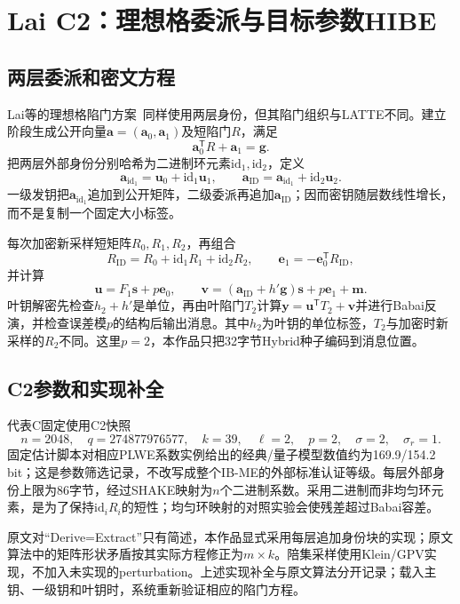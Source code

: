 \documentclass[UTF8,a4paper,12pt,oneside,openany,fontset=fandol]{ctexrep}
\begin{document}
\section{Lai C2：理想格委派与目标参数HIBE}
\subsection{两层委派和密文方程}
Lai等的理想格陷门方案~\cite{lai2015trapdoors}同样使用两层身份，但其陷门组织与LATTE不同。建立阶段生成公开向量$\mathbf a=(\mathbf a_0,\mathbf a_1)$及短陷门$R$，满足
\[
  \mathbf a_0^{\mathsf T}R+\mathbf a_1=\mathbf g.
\]
把两层外部身份分别哈希为二进制环元素$\mathrm{id}_1,\mathrm{id}_2$，定义
\[
  \mathbf a_{\mathrm{id}_1}=\mathbf u_0+\mathrm{id}_1\mathbf u_1,
  \qquad
  \mathbf a_{\mathrm{ID}}=\mathbf a_{\mathrm{id}_1}+\mathrm{id}_2\mathbf u_2.
\]
一级发钥把$\mathbf a_{\mathrm{id}_1}$追加到公开矩阵，二级委派再追加$\mathbf a_{\mathrm{ID}}$；因而密钥随层数线性增长，而不是复制一个固定大小标签。

每次加密新采样短矩阵$R_0,R_1,R_2$，再组合
\[
  R_{\mathrm{ID}}=R_0+\mathrm{id}_1R_1+\mathrm{id}_2R_2,
  \qquad \mathbf e_1=-\mathbf e_0^{\mathsf T}R_{\mathrm{ID}},
\]
并计算
\[
  \mathbf u=F_1\mathbf s+p\mathbf e_0,
  \qquad
  \mathbf v=(\mathbf a_{\mathrm{ID}}+h'\mathbf g)\mathbf s
           +p\mathbf e_1+\mathbf m.
\]
叶钥解密先检查$h_2+h'$是单位，再由叶陷门$T_2$计算$\mathbf y=\mathbf u^{\mathsf T}T_2+\mathbf v$并进行Babai反演，并检查误差模$p$的结构后输出消息。其中$h_2$为叶钥的单位标签，$T_2$与加密时新采样的$R_2$不同。这里$p=2$，本作品只把32字节Hybrid种子编码到消息位置。

\subsection{C2参数和实现补全}
代表C固定使用C2快照
\[
  n=2048,\quad q=274877976577,\quad k=39,\quad
  \ell=2,\quad p=2,\quad \sigma=2,\quad \sigma_r=1.
\]
固定估计脚本对相应PLWE系数实例给出的经典/量子模型数值约为169.9/154.2 bit；这是参数筛选记录，不改写成整个IB-ME的外部标准认证等级。每层外部身份上限为86字节，经过SHAKE映射为$n$个二进制系数。采用二进制而非均匀环元素，是为了保持$\mathrm{id}_iR_i$的短性；均匀环映射的对照实验会使残差超过Babai容差。

原文对“Derive=Extract”只有简述，本作品显式采用每层追加身份块的实现；原文算法中的矩阵形状矛盾按其实际方程修正为$m\times k$。陪集采样使用Klein/GPV实现，不加入未实现的perturbation。上述实现补全与原文算法分开记录；载入主钥、一级钥和叶钥时，系统重新验证相应的陷门方程。
\end{document}
